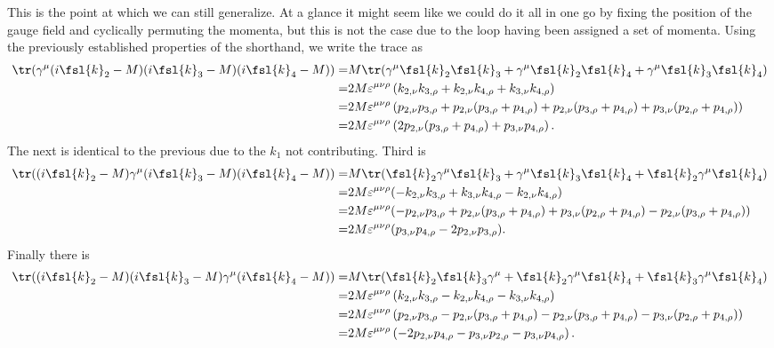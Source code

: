 This is the point at which we can still generalize. At a glance it might seem like we could do it all in one go by fixing the position of the gauge field and cyclically permuting the momenta, but this is not the case due to the loop having been assigned a set of momenta. Using the previously established properties of the shorthand, we write the trace as
\begin{align*}
	\tr(\gamma^{\mu}(i\fsl{k}_{2} - M)(i\fsl{k}_{3} - M)(i\fsl{k}_{4} - M)) =& M\tr(\gamma^{\mu}\fsl{k}_{2}\fsl{k}_{3} + \gamma^{\mu}\fsl{k}_{2}\fsl{k}_{4} + \gamma^{\mu}\fsl{k}_{3}\fsl{k}_{4}) \\
	=& 2M\varepsilon^{\mu\nu\rho}\left(k_{2, \nu}k_{3, \rho} + k_{2, \nu}k_{4, \rho} + k_{3, \nu}k_{4, \rho}\right) \\
	=& 2M\varepsilon^{\mu\nu\rho}\left(p_{2, \nu}p_{3, \rho} + p_{2, \nu}(p_{3, \rho} + p_{4, \rho}) + p_{2, \nu}(p_{3, \rho} + p_{4, \rho}) + p_{3, \nu}(p_{2, \rho} + p_{4, \rho})\right) \\
	=& 2M\varepsilon^{\mu\nu\rho}\left(2p_{2, \nu}(p_{3, \rho} + p_{4, \rho}) + p_{3, \nu}p_{4, \rho}\right).
\end{align*}
The next is identical to the previous due to the $k_{1}$ not contributing. Third is
\begin{align*}
	\tr((i\fsl{k}_{2} - M)\gamma^{\mu}(i\fsl{k}_{3} - M)(i\fsl{k}_{4} - M)) =& M\tr(\fsl{k}_{2}\gamma^{\mu}\fsl{k}_{3} + \gamma^{\mu}\fsl{k}_{3}\fsl{k}_{4} + \fsl{k}_{2}\gamma^{\mu}\fsl{k}_{4}) \\
	=& 2M\varepsilon^{\mu\nu\rho}(-k_{2, \nu}k_{3, \rho} + k_{3, \nu}k_{4, \rho} - k_{2, \nu}k_{4, \rho}) \\
	=& 2M\varepsilon^{\mu\nu\rho}(-p_{2, \nu}p_{3, \rho} + p_{2, \nu}(p_{3, \rho} + p_{4, \rho}) + p_{3, \nu}(p_{2, \rho} + p_{4, \rho}) - p_{2, \nu}(p_{3, \rho} + p_{4, \rho})) \\
	=& 2M\varepsilon^{\mu\nu\rho}(p_{3, \nu}p_{4, \rho} - 2p_{2, \nu}p_{3, \rho}).
\end{align*}
Finally there is
\begin{align*}
	\tr((i\fsl{k}_{2} - M)(i\fsl{k}_{3} - M)\gamma^{\mu}(i\fsl{k}_{4} - M)) =& M\tr(\fsl{k}_{2}\fsl{k}_{3}\gamma^{\mu} + \fsl{k}_{2}\gamma^{\mu}\fsl{k}_{4} + \fsl{k}_{3}\gamma^{\mu}\fsl{k}_{4}) \\
	=& 2M\varepsilon^{\mu\nu\rho}\left(k_{2, \nu}k_{3, \rho} - k_{2, \nu}k_{4, \rho} - k_{3, \nu}k_{4, \rho}\right) \\
	=& 2M\varepsilon^{\mu\nu\rho}\left(p_{2, \nu}p_{3, \rho} - p_{2, \nu}(p_{3, \rho} + p_{4, \rho}) - p_{2, \nu}(p_{3, \rho} + p_{4, \rho}) - p_{3, \nu}(p_{2, \rho} + p_{4, \rho})\right) \\
	=& 2M\varepsilon^{\mu\nu\rho}\left(-2p_{2, \nu}p_{4, \rho} - p_{3, \nu}p_{2, \rho} - p_{3, \nu}p_{4, \rho}\right).
\end{align*}
